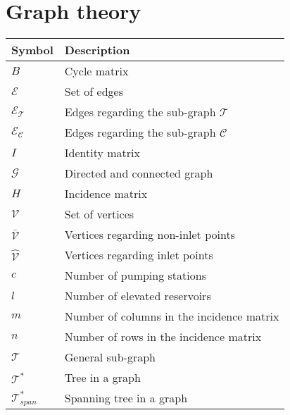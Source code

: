 \section*{Graph theory}

\begin{tabular}{l l} 
	\textbf{Symbol}		&	\textbf{Description}										\\\hline
	$B$		&	Cycle matrix		    												\\
	$\mathcal{E}$		&	Set of edges		    									\\
	$\mathcal{E_T}$		&	Edges regarding the sub-graph $\mathcal{T}$ 		    	\\
	$\mathcal{E_C}$		&	Edges regarding the sub-graph $\mathcal{C}$ 		    	\\
	$I$					&	Identity matrix		    									\\
	$\mathcal{G}$		&	Directed and connected graph								\\
	$H$		&	Incidence matrix		    											\\
	$\mathcal{V}$		&	Set of vertices		    									\\
	$\bar{\mathcal{V}}$ &	Vertices regarding non-inlet points	    					\\
	$\hat{\mathcal{V}}$ &	Vertices regarding inlet points	    						\\
	$c$		&	Number of pumping stations												\\
	$l$		&	Number of elevated reservoirs											\\
	$m$		&	Number of columns in the incidence matrix								\\
	$n$		&	Number of rows in the incidence matrix									\\
	$\mathcal{T}$		&	General sub-graph 		    								\\
	$\mathcal{T^*}$		&	Tree in a graph		    									\\
	$\mathcal{T}^*_{span}$		&	Spanning tree in a graph	    					\\
\end{tabular}	


	


